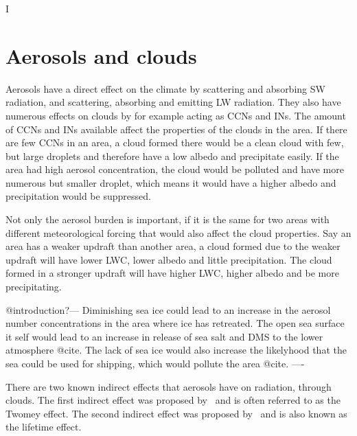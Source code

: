 
I%


\section{Aerosols and clouds}%
Aerosols have a direct effect on the climate by scattering and absorbing SW radiation, and scattering, absorbing and emitting LW radiation.%
They also have numerous effects on clouds by for example acting as CCNs and INs. The amount of CCNs and INs available affect the properties of the clouds in the area.
If there are few CCNs in an area, a cloud formed there would be a clean cloud with few, but large droplets and therefore have a low albedo and precipitate easily. If the area had high aerosol concentration, the cloud would be polluted and have more numerous but smaller droplet, which means it would have a higher albedo and precipitation would be suppressed. 

Not only the aerosol burden is important, if it is the same for two areas with different meteorological forcing that would also affect the cloud properties. Say an area has a weaker updraft than another area, a cloud formed due to the weaker updraft will have lower LWC, lower albedo and little precipitation. The cloud formed in a stronger updraft will have higher LWC, higher albedo and be more precipitating.

@introduction?---
Diminishing sea ice could lead to an increase in the aerosol number concentrations in the area where ice has retreated. The open sea surface it self would lead to an increase in release of sea salt and DMS to the lower atmosphere @cite. The lack of sea ice would also increase the likelyhood that the sea could be used for shipping, which would pollute the area @cite.
----

There are two known indirect effects that aerosols have on radiation, through clouds. The first indirect effect was proposed by~\citet{Twomey1974} and is often referred to as the Twomey effect. The second indirect effect was proposed by~\citet{Albrecht1989} and is also known as the lifetime effect.

